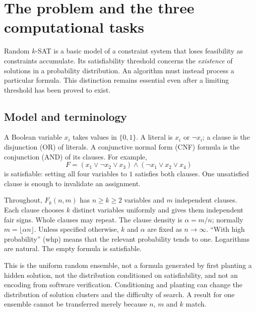 \section{The problem and the three computational tasks}
\label{sec:model}

Random $k$-SAT is a basic model of a constraint system that loses feasibility
as constraints accumulate. Its satisfiability threshold concerns the
\emph{existence} of solutions in a probability distribution. An algorithm must
instead process a particular formula. This distinction remains essential even
after a limiting threshold has been proved to exist.

\subsection{Model and terminology}
A Boolean variable $x_i$ takes values in $\{0,1\}$. A literal is $x_i$ or
$\neg x_i$; a clause is the disjunction (OR) of literals. A conjunctive normal
form (CNF) formula is the conjunction (AND) of its clauses. For example,
\[
 F=(x_1\vee\neg x_2\vee x_3)\wedge
   (\neg x_1\vee x_2\vee x_4)
\]
is satisfiable: setting all four variables to $1$ satisfies both clauses.
One unsatisfied clause is enough to invalidate an assignment.

Throughout, $F_k(n,m)$ has $n\ge k\ge2$ variables and $m$ independent
clauses. Each clause chooses $k$ distinct variables uniformly and gives them
independent fair signs. Whole clauses may repeat. The clause density is
$\alpha=m/n$; normally $m=\lfloor\alpha n\rfloor$. Unless specified otherwise,
$k$ and $\alpha$ are fixed as $n\to\infty$. ``With high probability'' (whp)
means that the relevant probability tends to one. Logarithms are natural.
The empty formula is satisfiable.

This is the uniform random ensemble, not a formula generated by first planting
a hidden solution, not the distribution conditioned on satisfiability, and not
an encoding from software verification. Conditioning and planting can change
the distribution of solution clusters and the difficulty of search. A result
for one ensemble cannot be transferred merely because $n$, $m$ and $k$ match.


